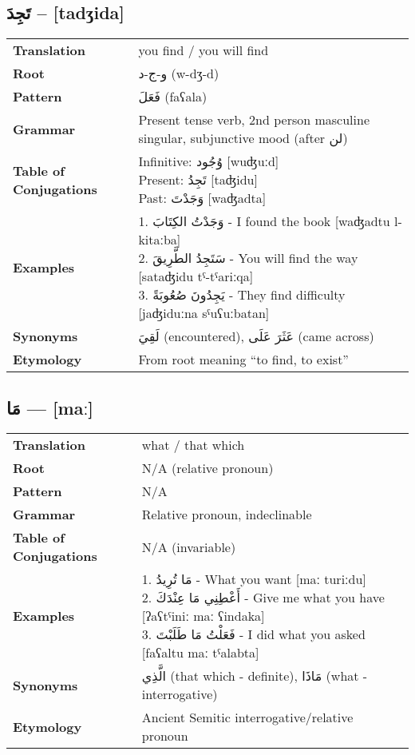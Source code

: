 \documentclass[a4paper,12pt]{article}
\begin{document}
\subsection{\textarabic{تَجِدَ} – [tadʒida]}
\begin{tabular}{p{3cm}p{10cm}}
\toprule
\textbf{Translation} & you find / you will find \\
\textbf{Root} & \textarabic{و-ج-د} (w-dʒ-d) \\
\textbf{Pattern} & \textarabic{فَعَلَ} (faʕala) \\
\textbf{Grammar} & Present tense verb, 2nd person masculine singular, subjunctive mood (after \textarabic{لن}) \\
\textbf{Table of Conjugations} & \makecell[l]{
Infinitive: \textarabic{وُجُود} [wuʤuːd]\\
Present: \textarabic{تَجِدُ} [taʤidu]\\
Past: \textarabic{وَجَدْتَ} [waʤadta]
} \\
\textbf{Examples} & \makecell[l]{\parbox{9.5cm}{
1. \textarabic{وَجَدْتُ الكِتَابَ} - I found the book [waʤadtu l-kitaːba]\\
2. \textarabic{سَتَجِدُ الطَّرِيقَ} - You will find the way [sataʤidu tˤ-tˤariːqa]\\
3. \textarabic{يَجِدُونَ صُعُوبَةً} - They find difficulty [jaʤiduːna sˤuʕuːbatan]
}} \\
\midrule
\textbf{Synonyms} & \textarabic{لَقِيَ} (encountered), \textarabic{عَثَرَ عَلَى} (came across) \\
\textbf{Etymology} & From root meaning ``to find, to exist'' \\
\bottomrule
\end{tabular}

\subsection{\textarabic{مَا} — [maː]}
\begin{tabular}{p{3cm}p{10cm}}
\toprule
\textbf{Translation} & what / that which \\
\textbf{Root} & N/A (relative pronoun) \\
\textbf{Pattern} & N/A \\
\textbf{Grammar} & Relative pronoun, indeclinable \\
\textbf{Table of Conjugations} & N/A (invariable) \\
\textbf{Examples} & \makecell[l]{\parbox{9.5cm}{
1. \textarabic{مَا تُرِيدُ} - What you want [maː turiːdu]\\
2. \textarabic{أَعْطِنِي مَا عِنْدَكَ} - Give me what you have [ʔaʕtˤiniː maː ʕindaka]\\
3. \textarabic{فَعَلْتُ مَا طَلَبْتَ} - I did what you asked [faʕaltu maː tˤalabta]
}} \\
\midrule
\textbf{Synonyms} & \textarabic{الَّذِي} (that which - definite), \textarabic{مَاذَا} (what - interrogative) \\
\textbf{Etymology} & Ancient Semitic interrogative/relative pronoun \\
\bottomrule
\end{tabular}
\end{document}
